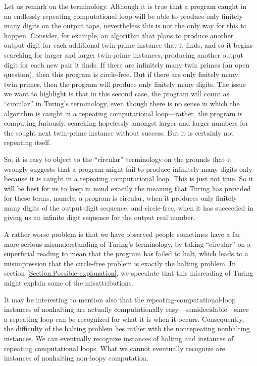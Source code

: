 \documentclass{amsart}
\begin{document}
Let us remark on the terminology. Although it is true that a program caught in an endlessly repeating computational loop will be able to produce only finitely many digits on the output tape, nevertheless this is not the only way for this to happen.  Consider, for example, an algorithm that plans to produce another output digit for each additional twin-prime instance that it finds, and so it begins searching for larger and larger twin-prime instances, producing another output digit for each new pair it finds. If there are infinitely many twin primes (an open question), then this program is circle-free. But if there are only finitely many twin primes, then the program will produce only finitely many digits. The issue we want to highlight is that in this second case, the program will count as ``circular'' in Turing's terminology, even though there is no sense in which the algorithm is caught in a repeating computational loop---rather, the program is computing furiously, searching hopelessly amongst larger and larger numbers for the sought next twin-prime instance without success. But it is certainly not repeating itself.

So, it is easy to object to the ``circular'' terminology on the grounds that it wrongly suggests that a program might fail to produce infinitely many digits only because it is caught in a repeating computational loop. This is just not true. So it will be best for us to keep in mind exactly the meaning that Turing has provided for these terms, namely, a program is circular, when it produces only finitely many digits of the output digit sequence, and circle-free, when it has succeeded in giving us an infinite digit sequence for the output real number. 

A rather worse problem is that we have observed people sometimes have a far more serious misunderstanding of Turing's terminology, by taking ``circular'' on a superficial reading to mean that the program has failed to halt, which leads to a misimpression that the circle-free problem is exactly the halting problem. In section \ref{Section.Possible-explanation}, we speculate that this misreading of Turing might explain some of the misattributions.

It may be interesting to mention also that the repeating-computational-loop instances of nonhalting are actually computationally easy---semidecidable---since a repeating loop can be recognized for what it is when it occurs. Consequently, the difficulty of the halting problem lies rather with the nonrepeating nonhalting instances. We can eventually recognize instances of halting and instances of repeating computational loops. What we cannot eventually recognize are instances of nonhalting non-loopy computation. 
\end{document}
